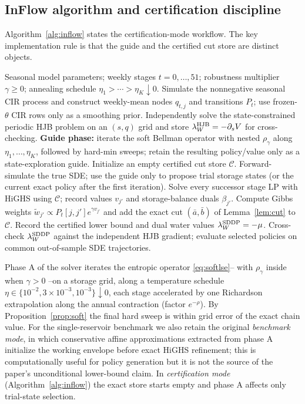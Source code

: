 \documentclass[pdflatex,sn-mathphys-num]{sn-jnl}
\theoremstyle{thmstyleone}
\theoremstyle{thmstyletwo}
\theoremstyle{thmstylethree}
\begin{document}
\subsection{InFlow algorithm and certification discipline}
\label{sec:anneal}

Algorithm~\ref{alg:inflow} states the certification-mode workflow. The key
implementation rule is that the guide and the certified cut store are distinct
objects.

\begin{algorithm}[t]
\caption{InFlow: periodic entropic SDDP with independent HJB cross-certification}
\label{alg:inflow}
\begin{algorithmic}[1]
\Require Seasonal model parameters; weekly stages $t=0,\ldots,51$; robustness
multiplier $\gamma\ge0$; annealing schedule $\eta_1>\cdots>\eta_K\downarrow0$.
\State Simulate the nonnegative seasonal CIR process and construct weekly-mean
nodes $q_{t,j}$ and transitions $P_t$; use frozen-$\theta$ CIR rows only as a
smoothing prior.
\State Independently solve the state-constrained periodic HJB problem on an
$(s,q)$ grid and store $\lambda_W^{\rm HJB}=-\partial_sV$ for cross-checking.
\State \textbf{Guide phase:} iterate the soft Bellman operator with nested
$\rho_\gamma$ along $\eta_1,\ldots,\eta_K$, followed by hard-min sweeps; retain
the resulting policy/value only as a state-exploration guide.
\State Initialize an empty certified cut store $\mathcal C$.
  \State Forward-simulate the true SDE; use the guide only to propose trial
  storage states (or the current exact policy after the first iteration).
    \State Solve every successor stage LP with HiGHS using $\mathcal C$; record
    values $v_{j'}$ and storage-balance duals $\beta_{j'}$.
    \State Compute Gibbs weights
    $\tilde w_{j'}\propto P_t[j,j']e^{\gamma v_{j'}}$ and add the exact cut
    $(\bar a,\bar b)$ of Lemma~\ref{lem:cut} to $\mathcal C$.
  \EndFor
  \State Record the certified lower bound and dual water values
  $\lambda_W^{\rm SDDP}=-\mu$.
\EndFor
\State Cross-check $\lambda_W^{\rm SDDP}$ against the independent HJB gradient;
evaluate selected policies on common out-of-sample SDE trajectories.
\end{algorithmic}
\end{algorithm}

Phase A of the solver iterates the entropic operator
\eqref{eq:softlse}-- with $\rho_\gamma$ inside when $\gamma>0$ --on a
storage grid, along a temperature schedule
$\eta \in \{10^{-2}, 3\times10^{-3}, 10^{-3}\} \downarrow 0$, each stage
accelerated by one Richardson extrapolation along the annual
contraction (factor $e^{-\rho}$). By Proposition~\ref{prop:soft} the
final hard sweep is within grid error of the exact chain value. For the single-reservoir benchmark we also retain the original
\emph{benchmark mode}, in which conservative affine approximations extracted
from phase A initialize the working envelope before exact HiGHS refinement;
this is computationally useful for policy generation but it is not the source
of the paper's unconditional lower-bound claim. In \emph{certification mode}
(Algorithm~\ref{alg:inflow}) the exact store starts empty and phase A affects
only trial-state selection.
\end{document}
